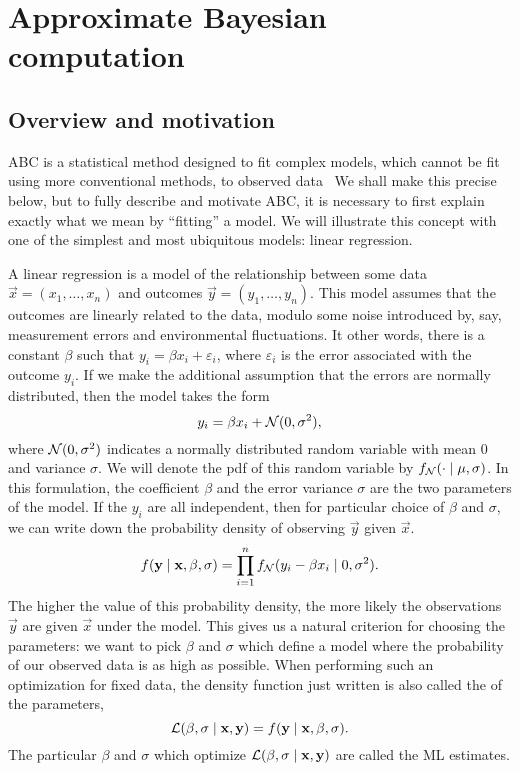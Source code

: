 \section{Approximate Bayesian computation}
\label{sec:abc}

\subsection{Overview and motivation}

\Gls{ABC} is a statistical method designed to fit complex models, which cannot
be fit using more conventional methods, to observed
data~\autocite{marin2012approximate, sunnaker2013approximate,
beaumont2010approximate} We shall make this precise below, but to fully
describe and motivate \gls{ABC}, it is necessary to first explain exactly what
we mean by ``fitting'' a model. We will illustrate this concept with one of the
simplest and most ubiquitous models: linear regression.

A linear regression is a model of the relationship between some data $\vec{x} =
(x_1, \ldots, x_n)$ and outcomes $\vec{y} = (y_1, \ldots, y_n)$. This model
assumes that the outcomes are linearly related to the data, modulo some noise
introduced by, say, measurement errors and environmental fluctuations. It other
words, there is a constant $\beta$ such that $y_i = \beta x_i + \varepsilon_i$,
where $\varepsilon_i$ is the error associated with the outcome $y_i$. If we
make the additional assumption that the errors are normally distributed, then
the model takes the form
\[
  y_i = \beta x_i + \mathcal{N}(0, \sigma^2),
\]
where $\mathcal{N}(0, \sigma^2)$ indicates a normally distributed random variable with
mean 0 and variance $\sigma$. We will denote the \gls{pdf} of this random
variable by $f_{\mathcal{N}}(\cdot \mid \mu, \sigma)$. In this formulation, the
coefficient $\beta$ and the error variance $\sigma$ are the two parameters of
the model. If the $y_i$ are all independent, then for particular choice of
$\beta$ and $\sigma$, we can write down the probability density of observing
$\vec{y}$ given $\vec{x}$.
\[
  f(\mathbf{y} \mid \mathbf{x}, \beta, \sigma) = 
  \prod_{i=1}^n f_{\mathcal{N}}(y_i - \beta x_i \mid 0, \sigma^2).
\]
The higher the value of this probability density, the more likely the
observations $\vec{y}$ are given $\vec{x}$ under the model. This gives us a
natural criterion for choosing the parameters: we want to pick $\beta$ and
$\sigma$ which define a model where the probability of our observed data is as
high as possible. When performing such an optimization for fixed data, the
density function just written is also called the  of the
parameters,
\[
  \mathcal{L}(\beta, \sigma \mid \mathbf{x}, \mathbf{y}) = f(\mathbf{y} \mid \mathbf{x}, \beta, \sigma).
\]
The particular $\beta$ and $\sigma$ which optimize $\mathcal{L}(\beta, \sigma \mid
\mathbf{x}, \mathbf{y})$ are called the \gls{ML} estimates. 

